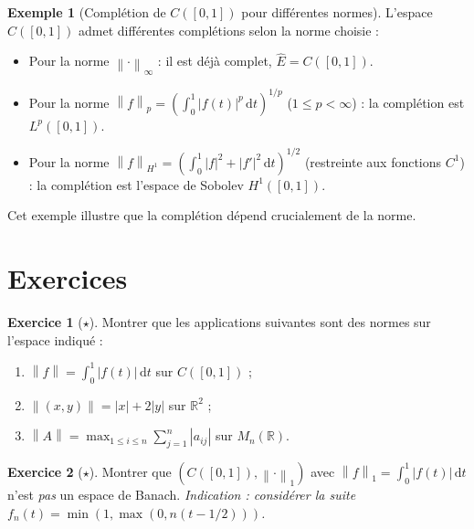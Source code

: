 \documentclass[a4paper,12pt]{book}
\newcommand{\R}{\mathbb{R}}
\newcommand{\dd}{\mathrm{d}}
\newcommand{\norm}[1]{\left\| #1 \right\|}
\newcommand{\abs}[1]{\left| #1 \right|}
\theoremstyle{definition}
\newtheorem{exemple}[definition]{Exemple}
\newtheorem{exercice}{Exercice}[chapter]
\theoremstyle{plain}
\theoremstyle{remark}
\begin{document}
\begin{exemple}[{Complétion de $C([0,1])$ pour différentes normes}]\label{ex:completion-C01}
L'espace $C([0,1])$ admet différentes complétions selon la norme choisie :
\begin{itemize}
    \item Pour la norme $\norm{\cdot}_\infty$ : il est déjà complet, $\hat{E} = C([0,1])$.
    \item Pour la norme $\norm{f}_p = \left(\int_0^1 \abs{f(t)}^p\,\dd t\right)^{1/p}$ ($1 \leq p < \infty$) : la complétion est $L^p([0,1])$.
    \item Pour la norme $\norm{f}_{H^1} = \left(\int_0^1 \abs{f}^2 + \abs{f'}^2\,\dd t\right)^{1/2}$ (restreinte aux fonctions $C^1$) : la complétion est l'espace de Sobolev $H^1([0,1])$.
\end{itemize}
Cet exemple illustre que la complétion dépend crucialement de la norme.
\end{exemple}

\section{Exercices}

\begin{exercice}[$\star$]\label{exo:ch1-norme-verif}
Montrer que les applications suivantes sont des normes sur l'espace indiqué :
\begin{enumerate}[label=(\alph*)]
    \item $\norm{f} = \int_0^1 \abs{f(t)} \, \dd t$ sur $C([0,1])$ ;
    \item $\norm{(x,y)} = \abs{x} + 2\abs{y}$ sur $\R^2$ ;
    \item $\norm{A} = \max_{1\leq i\leq n} \sum_{j=1}^n \abs{a_{ij}}$ sur $M_n(\R)$.
\end{enumerate}
\end{exercice}

\begin{exercice}[$\star$]\label{exo:ch1-non-complet}
Montrer que $(C([0,1]), \norm{\cdot}_1)$ avec $\norm{f}_1 = \int_0^1 \abs{f(t)}\, \dd t$ n'est \emph{pas} un espace de Banach. \textit{Indication : considérer la suite $f_n(t) = \min(1, \max(0, n(t - 1/2)))$.}
\end{exercice}
\end{document}
